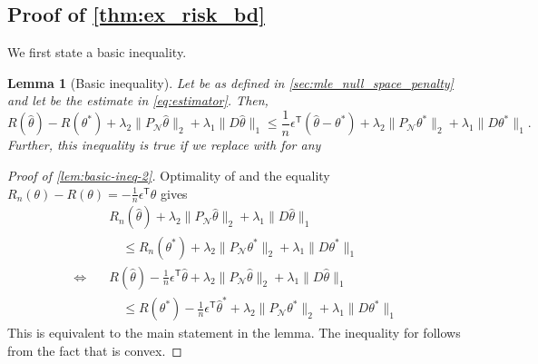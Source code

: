 \documentclass[ejs,noshowframe]{imsart}
\theoremstyle{plain}
\newtheorem{lemma}[theorem]{Lemma}
\theoremstyle{definition}
\newcommand{\cN}{\mathcal{N}}
\renewcommand{\hat}{\widehat}
\renewcommand{\top}{\mathsf{T}}
\begin{document}
\begin{appendix}
\subsection{Proof of \autoref{thm:ex_risk_bd}}
\label{sec:app_ex_risk_bd}
We first state a basic inequality.
\begin{lemma}[Basic inequality]
\label{lem:basic-ineq-2}
Let  be as defined in \autoref{sec:mle_null_space_penalty} and let \smash{$\hat\theta$} 
be the estimate 
in \eqref{eq:estimator}. Then,
\[
R(\hat\theta) - R(\theta^*) + \lambda_2 \|P_\cN \hat\theta\|_2 + \lambda_1 
\|D\hat\theta\|_1\leq \frac{1}{n} \epsilon^\top (\hat \theta - 
\theta^*) + \lambda_2 \| P_\cN\theta^*\|_2 + \lambda_1 \| D \theta^* \|_1.
\]
Further, this inequality is true if we replace \smash{$\hat\theta$} with 
\smash{$\hat\theta_t = t 
\hat\theta + (1-t) \theta^*$} for any 
\end{lemma}
\begin{proof}[Proof of \autoref{lem:basic-ineq-2}]
Optimality of \smash{$\hat\theta$} and the equality 
$R_n(\theta) - R(\theta) = -\frac{1}{n}\epsilon^\top\theta$ gives
\begin{align*}
&R_n(\hat\theta)  + \lambda_2 \|P_\cN \hat\theta\|_2 + \lambda_1 \|D\hat\theta\|_1 \\
&\quad\leq   R_n(\theta^*) + \lambda_2 \| P_\cN\theta^*\|_2 + \lambda_1 \| D \theta^* 
\|_1 \\
\Leftrightarrow\quad &R(\hat\theta) - \frac{1}{n}\epsilon^\top\hat\theta + \lambda_2 
\|P_\cN \hat\theta\|_2 + \lambda_1 \|D\hat\theta\|_1\\
&\quad\leq   R(\theta^*) - \frac{1}{n}\epsilon^\top\hat\theta^*+ \lambda_2 \| 
P_\cN\theta^*\|_2 + \lambda_1 \| D \theta^* \|_1
\end{align*}
This is equivalent to the main statement in the lemma.
The  inequality for \smash{$\hat\theta_t$} follows from the fact that 
\smash{$ \theta \mapsto 
R_n(\theta) + \lambda_1  \|D\theta\|_1 + \lambda_2 \|P_\cN \theta\|_2$} is convex.
\end{proof}



\end{appendix}
\end{document}
